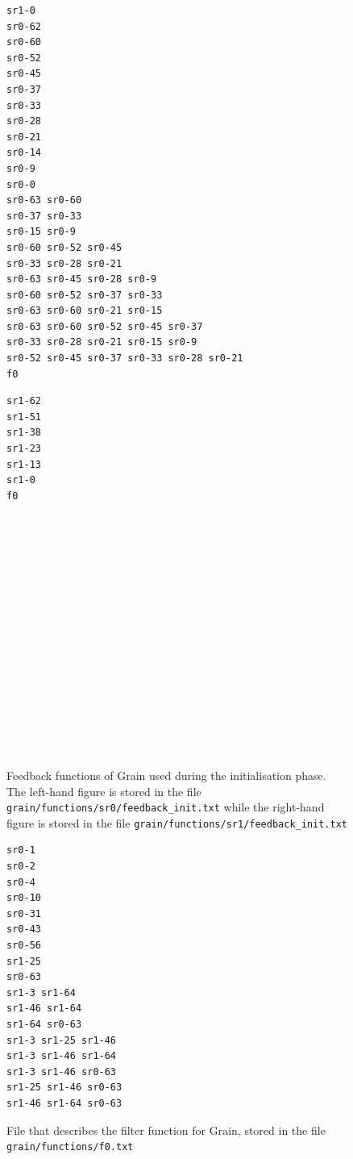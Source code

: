 \documentclass{llncs}
\begin{document}
\begin{figure}[tb]
\centering
\begin{subfloat}
\begin{minipage}{2.8in}
\small
\begin{Verbatim}[frame=lines]
sr1-0
sr0-62
sr0-60
sr0-52
sr0-45
sr0-37
sr0-33
sr0-28
sr0-21
sr0-14
sr0-9
sr0-0
sr0-63 sr0-60
sr0-37 sr0-33
sr0-15 sr0-9
sr0-60 sr0-52 sr0-45
sr0-33 sr0-28 sr0-21
sr0-63 sr0-45 sr0-28 sr0-9
sr0-60 sr0-52 sr0-37 sr0-33
sr0-63 sr0-60 sr0-21 sr0-15
sr0-63 sr0-60 sr0-52 sr0-45 sr0-37
sr0-33 sr0-28 sr0-21 sr0-15 sr0-9
sr0-52 sr0-45 sr0-37 sr0-33 sr0-28 sr0-21
f0
\end{Verbatim}
\end{minipage}
\caption{Feedback of the NLFSR}
\label{fig:sr0feedback}
\end{subfloat}
\qquad
\begin{subfloat}
\begin{minipage}{1.3in}
\small
\begin{Verbatim}[frame=lines]
sr1-62
sr1-51
sr1-38
sr1-23
sr1-13
sr1-0
f0

















\end{Verbatim}
\end{minipage}
\caption{Feedback of the LFSR}
\label{fig:sr1feedback}
\end{subfloat}
\caption{Feedback functions of Grain used during the initialisation phase. The left-hand figure is stored in the file \texttt{grain/functions/sr0/feedback\_init.txt} while the right-hand figure is stored in the file \texttt{grain/functions/sr1/feedback\_init.txt}}
\label{fig:feedbacks}
\end{figure}

\begin{figure}[tb]
{
\small
\begin{Verbatim}[frame=lines]
sr0-1
sr0-2
sr0-4
sr0-10
sr0-31
sr0-43
sr0-56
sr1-25
sr0-63
sr1-3 sr1-64
sr1-46 sr1-64
sr1-64 sr0-63
sr1-3 sr1-25 sr1-46
sr1-3 sr1-46 sr1-64
sr1-3 sr1-46 sr0-63
sr1-25 sr1-46 sr0-63
sr1-46 sr1-64 sr0-63
\end{Verbatim}
}
\caption{File that describes the filter function for Grain, stored in the file \texttt{grain/functions/f0.txt}}
\label{fig:f0}
\end{figure}
\end{document}
